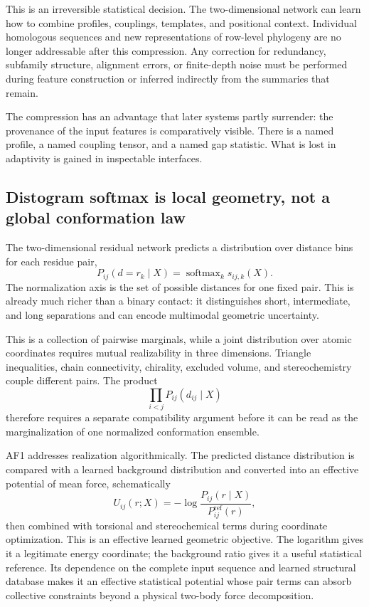 This is an irreversible statistical decision.  The two-dimensional network can learn how to
combine profiles, couplings, templates, and positional context.  Individual homologous sequences
and new representations of row-level phylogeny are no longer addressable after this compression.  Any
correction for redundancy, subfamily structure, alignment errors, or finite-depth noise must be
performed during feature construction or inferred indirectly from the summaries that remain.

The compression has an advantage that later systems partly surrender: the provenance of the input
features is comparatively visible.  There is a named profile, a named coupling tensor, and a named
gap statistic.  What is lost in adaptivity is gained in inspectable interfaces.

\subsection{Distogram softmax is local geometry, not a global conformation law}

The two-dimensional residual network predicts a distribution over distance bins for each residue
pair,
\begin{equation}
P_{ij}(d=r_k\mid X)
=\operatorname{softmax}_{k}s_{ij,k}(X).
\label{eq:book-af1-distogram}
\end{equation}
The normalization axis is the set of possible distances for one fixed pair.  This is already much
richer than a binary contact: it distinguishes short, intermediate, and long separations and can
encode multimodal geometric uncertainty.

This is a collection of pairwise marginals, while a joint distribution over atomic coordinates
requires mutual realizability in three dimensions.  Triangle
inequalities, chain connectivity, chirality, excluded volume, and stereochemistry couple different
pairs.  The product
\begin{equation}
\prod_{i<j}P_{ij}(d_{ij}\mid X)
\end{equation}
therefore requires a separate compatibility argument before it can be read as the marginalization
of one normalized conformation ensemble.

AF1 addresses realization algorithmically.  The predicted distance distribution is compared with
a learned background distribution and converted into an effective potential of mean force,
schematically
\begin{equation}
U_{ij}(r;X)
=-\log\frac{P_{ij}(r\mid X)}{P_{ij}^{\mathrm{ref}}(r)},
\label{eq:book-af1-pmf}
\end{equation}
then combined with torsional and stereochemical terms during coordinate optimization.  This is an
effective learned geometric objective.  The logarithm gives it a legitimate energy coordinate;
the background ratio gives it a useful statistical reference.  Its dependence on the complete
input sequence and learned structural database makes it an effective statistical potential whose
pair terms can absorb collective constraints beyond a physical two-body force decomposition.


